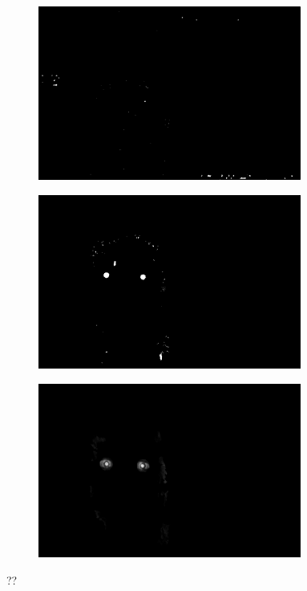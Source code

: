 \begin{figure}[H]
\begin{subfigure}{.33\textwidth}
  \centering
  \includegraphics[width=0.95\textwidth]{img/fd/OverSaturatedMask.png}
  \caption{}
\end{subfigure}%
\begin{subfigure}{.33\textwidth}
  \centering
  \includegraphics[width=0.95\textwidth]{img/fd/FilteredFaceMaskEyesReal.png}
  \caption{}
\end{subfigure}%
\begin{subfigure}{.33\textwidth}
  \centering
  \includegraphics[width=0.95\textwidth]{img/fd/EyeMap2.png}
  \caption{}
\end{subfigure}%

\caption{??}
\label{fig:eyeMap}
\end{figure}



